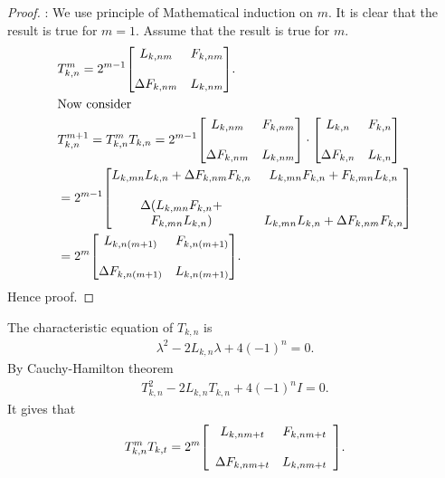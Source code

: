\begin{proof}:
We use principle of Mathematical induction on $m$. It is clear that the result is true for $m=1$. Assume that the result is true for $m$.
\begin{align*}
&T_{k,n}^m = 2^{m-1}{
          \begin{bmatrix}
            L_{k,nm} & F_{k,nm}\bigskip \\
            \Delta F_{k,nm} & L_{k,nm} 
          \end{bmatrix}
        }.\\
&\text{Now consider}\\
&T_{k,n}^{m+1}=T_{k,n}^mT_{k,n}=2^{m-1}{
          \begin{bmatrix}
            L_{k,nm} & F_{k,nm}\bigskip \\
            \Delta F_{k,nm} & L_{k,nm} 
          \end{bmatrix}
        }\cdot {
          \begin{bmatrix}
            L_{k,n} & F_{k,n} \bigskip\\
            \Delta F_{k,n} & L_{k,n} 
          \end{bmatrix}
        }\\
        &=2^{m-1}{
          \begin{bmatrix}
            L_{k,mn}L_{k,n}+\Delta F_{k,nm}F_{k,n} & L_{k,mn}F_{k,n}+F_{k,mn}L_{k,n}\bigskip \\
						\Delta (L_{k,mn}F_{k,n}+\\F_{k,mn}L_{k,n}) & L_{k,mn}L_{k,n}+\Delta F_{k,nm}F_{k,n} 
					 \end{bmatrix}
						}\\			
					&= 2^m{
          \begin{bmatrix}
            L_{k,n(m+1)} & F_{k,n(m+1)}\bigskip \\
            \Delta F_{k,n(m+1)} & L_{k,n(m+1)} 
          \end{bmatrix}
        }.
        \end{align*}
Hence proof.
\end{proof}	
\noindent The characteristic equation of $T_{k,n}$ is
	\begin{align*}
	\lambda^2-2L_{k,n}\lambda+4(-1)^n=0.
	\end{align*}
	By Cauchy-Hamilton theorem
	\begin{align*}
	T_{k,n}^2-2L_{k,n}T_{k,n}+4(-1)^nI=0.
	\end{align*}
It gives that
\begin{align*}
 T_{k,n}^mT_{k,t} = 2^{m}{\left[
          \begin{array}{cc}
            L_{k,nm+t} & F_{k,nm+t}\bigskip \\
            \Delta F_{k,nm+t} & L_{k,nm+t} 
          \end{array}
        \right]}.
\end{align*}
